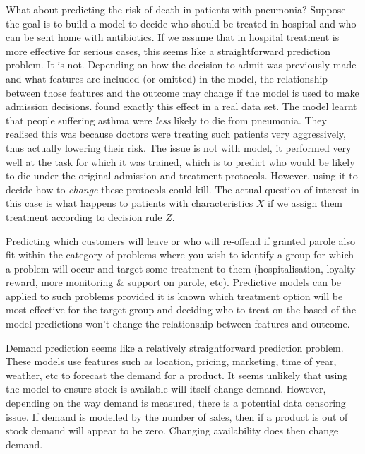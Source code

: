 \documentclass[11pt,a4paper,oneside]{book}
\theoremstyle{plain}
\theoremstyle{definition}
\begin{document}
What about predicting the risk of death in patients with pneumonia? Suppose the goal is to build a model to decide who should be treated in hospital and who can be sent home with antibiotics. If we assume that in hospital treatment is more effective for serious cases, this seems like a straightforward prediction problem. It is not. Depending on how the decision to admit was previously made and what features are included (or omitted) in the model, the relationship between those features and the outcome may change if the model is used to make admission decisions. \citet{Caruana2015} found exactly this effect in a real data set. The model learnt that people suffering asthma were \emph{less} likely to die from pneumonia. They realised this was because doctors were treating such patients very aggressively, thus actually lowering their risk. The issue is not with model, it performed very well at the task for which it was trained, which is to predict who would be likely to die under the original admission and treatment protocols. However, using it to decide how to \emph{change} these protocols could kill. The actual question of interest in this case is what happens to patients with characteristics $X$ if we assign them treatment according to decision rule $Z$. 

Predicting which customers will leave or who will re-offend if granted parole also fit within the category of problems where you wish to identify a group for which a problem will occur and target some treatment to them (hospitalisation, loyalty reward, more monitoring \& support on parole, etc). Predictive models can be applied to such problems provided it is known which treatment option will be most effective for the target group and deciding who to treat on the based of the model predictions won't change the relationship between features and outcome.

Demand prediction seems like a relatively straightforward prediction problem. These models use features such as location, pricing, marketing, time of year, weather, etc to forecast the demand for a product. It seems unlikely that using the model to ensure stock is available will itself change demand. However, depending on the way demand is measured, there is a potential data censoring issue. If demand is modelled by the number of sales, then if a product is out of stock demand will appear to be zero. Changing availability does then change demand.
   
\end{document}
